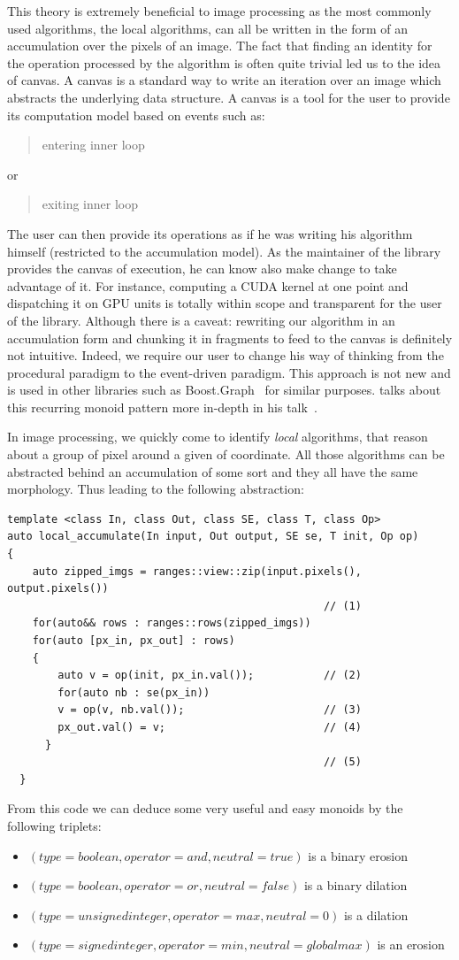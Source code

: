 This theory is extremely beneficial to image processing as the most commonly used algorithms, the local algorithms, can
all be written in the form of an accumulation over the pixels of an image. The fact that finding an identity for the
operation processed by the algorithm is often quite trivial led us to the idea of canvas. A canvas is a standard way to
write an iteration over an image which abstracts the underlying data structure. A canvas is a tool for the user to
provide its computation model based on events such as: \blockquote{entering inner loop} or \blockquote{exiting inner
  loop}. The user can then provide its operations as if he was writing his algorithm himself (restricted to the
accumulation model). As the maintainer of the library provides the canvas of execution, he can know also make change to
take advantage of it. For instance, computing a CUDA kernel at one point and dispatching it on GPU units is totally
within scope and transparent for the user of the library. Although there is a caveat: rewriting our algorithm in an
accumulation form and chunking it in fragments to feed to the canvas is definitely not intuitive. Indeed, we require our
user to change his way of thinking from the procedural paradigm to the event-driven paradigm. This approach is not new
and is used in other libraries such as Boost.Graph~\cite{siek.2001.boostgraph} for similar purposes.
\citeauthor{dean.2019.monoids} talks about this recurring monoid pattern more in-depth in his
talk~\parencite{dean.2019.monoids}.

In image processing, we quickly come to identify \emph{local} algorithms, that reason about a group of pixel around a
given of coordinate. All those algorithms can be abstracted behind an accumulation of some sort and they all have the
same morphology. Thus leading to the following abstraction:
\begin{verbatim}
template <class In, class Out, class SE, class T, class Op>
auto local_accumulate(In input, Out output, SE se, T init, Op op)
{
    auto zipped_imgs = ranges::view::zip(input.pixels(), output.pixels())
                                                  // (1)
    for(auto&& rows : ranges::rows(zipped_imgs))
    for(auto [px_in, px_out] : rows)
    {
        auto v = op(init, px_in.val());           // (2)
        for(auto nb : se(px_in))
        v = op(v, nb.val());                      // (3)
        px_out.val() = v;                         // (4)
      }
                                                  // (5)
  }
\end{verbatim}
From this code we can deduce some very useful and easy monoids by the following triplets:
\begin{itemize}
  \item $(type = boolean, operator = and, neutral = true)$ is a binary erosion
  \item $(type = boolean, operator = or, neutral = false)$ is a binary dilation
  \item $(type = unsigned integer, operator = max, neutral = 0)$ is a dilation
  \item $(type = signed integer, operator = min, neutral = global max)$ is an erosion
\end{itemize}

